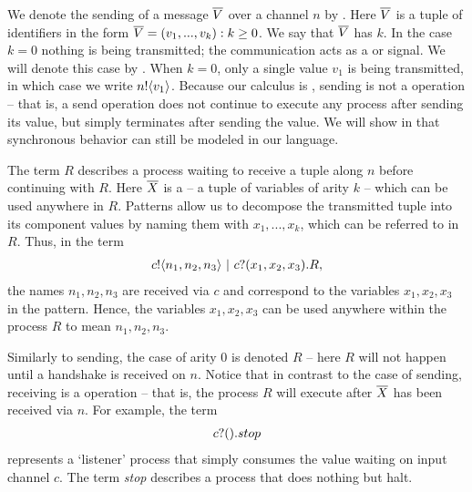	We denote the sending of a message $\overline{V}$ over a channel $n$ by .  Here $\overline{V}$ is a tuple of identifiers in the form $\overline{V}=(v_1,...,v_k):k\geq 0$.  We say that $\overline{V}$ has  $k$.  In the case $k=0$ nothing is being transmitted; the communication acts as a  or signal.  We will denote this case by .  When $k=0$, only a single value $v_1$ is being transmitted, in which case we write ${n}!\langle{v_1}\rangle$.  Because our calculus is , sending is not a  operation -- that is, a send operation does not continue to execute any process after sending its value, but simply terminates after sending the value.  We will show in  that synchronous behavior can still be modeled in our language.
	
	The term $R$ describes a process waiting to receive a tuple along $n$ before continuing with $R$.  Here $\overline{X}$ is a  -- a tuple of variables of arity $k$ -- which can be used anywhere in $R$.  Patterns allow us to decompose the transmitted tuple into its component values by naming them with $x_1,...,x_k$, which can be referred to in $R$.  Thus, in the term
	\begin{align}
		{c}!\langle{n_1,n_2,n_3}\rangle \ |\  {c}?({x_1,x_2,x_3}). R,
	\end{align}
the names $n_1,n_2,n_3$ are received via $c$ and correspond to the variables $x_1,x_2,x_3$ in the pattern.   Hence, the variables $x_1,x_2,x_3$ can be used anywhere within the process $R$ to mean $n_1,n_2,n_3$.  

Similarly to sending, the case of arity 0 is denoted $R$ -- here $R$ will not happen until a handshake is received on $n$.  Notice that in contrast to the case of sending, receiving is a  operation -- that is, the process $R$ will execute after $\overline{X}$ has been received via $n$.  For example, the term
\begin{align}
	{c}?({}).stop
\end{align}
represents a `listener'	process that simply consumes the value waiting on input channel $c$.  The term \emph{stop} describes a process that does nothing but halt.

